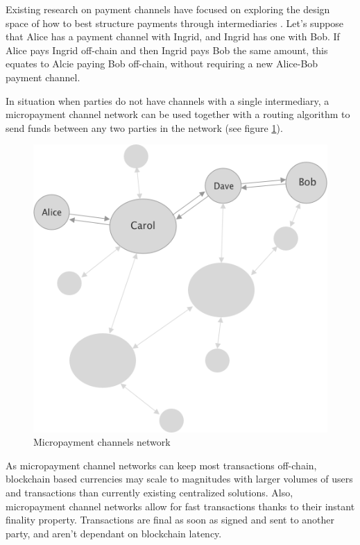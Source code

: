 \documentclass[a4paper,12pt]{article}
\begin{document}
Existing research on payment channels have focused on exploring the design space of 
how to best structure payments through intermediaries \cite{counterfactual, perun, 
lightning}. Let’s suppose that Alice has a payment channel with Ingrid, and Ingrid 
has one with Bob. If Alice pays Ingrid off-chain and then Ingrid pays Bob the same 
amount, this equates to Alcie paying Bob off-chain, without requiring a new 
Alice-Bob payment channel.

In situation when parties do not have channels with a single intermediary, a 
micropayment channel network can be used together with a routing algorithm to send 
funds between any two parties in the network (see figure \ref{img:lightning}).

\begin{figure}[H]
    \centering
    \includegraphics[scale=0.5]{../img/lightning-network}
    \caption{Micropayment channels network}
    \label{img:lightning}
\end{figure}

As micropayment channel networks can keep most transactions off-chain, blockchain 
based currencies may scale to magnitudes with larger volumes of users and 
transactions than currently existing centralized solutions. Also, micropayment 
channel networks allow for fast transactions thanks to their instant finality 
property. Transactions are final as soon as signed and sent to another party, and 
aren’t dependant on blockchain latency.
\end{document}

